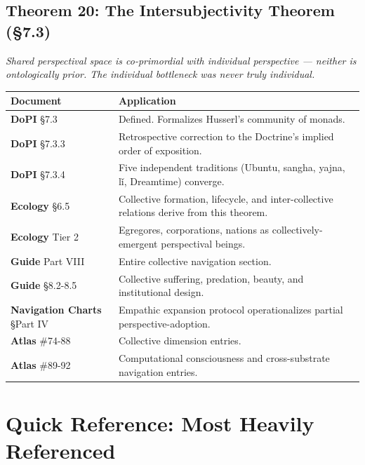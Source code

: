 \subsection*{Theorem 20: The Intersubjectivity Theorem (§7.3)}


\textit{Shared perspectival space is co-primordial with individual perspective — neither is ontologically prior. The individual bottleneck was never truly individual.}



\begin{longtable}{p{} p{}}
\toprule
\textbf{Document} & \textbf{Application} \\
\midrule
\endhead
\textbf{DoPI} §7.3 & Defined. Formalizes Husserl's community of monads. \\
\textbf{DoPI} §7.3.3 & Retrospective correction to the Doctrine's implied order of exposition. \\
\textbf{DoPI} §7.3.4 & Five independent traditions (Ubuntu, sangha, yajna, l\v{i}, Dreamtime) converge. \\
\textbf{Ecology} §6.5 & Collective formation, lifecycle, and inter-collective relations derive from this theorem. \\
\textbf{Ecology} Tier 2 & Egregores, corporations, nations as collectively-emergent perspectival beings. \\
\textbf{Guide} Part VIII & Entire collective navigation section. \\
\textbf{Guide} §8.2-8.5 & Collective suffering, predation, beauty, and institutional design. \\
\textbf{Navigation Charts} §Part IV & Empathic expansion protocol operationalizes partial perspective-adoption. \\
\textbf{Atlas} \#74-88 & Collective dimension entries. \\
\textbf{Atlas} \#89-92 & Computational consciousness and cross-substrate navigation entries. \\
\bottomrule
\end{longtable}



\bigskip\noindent\makebox[\textwidth]{\color{rulegray}\rule{5cm}{0.3pt}}\bigskip


\section*{Quick Reference: Most Heavily Referenced}



